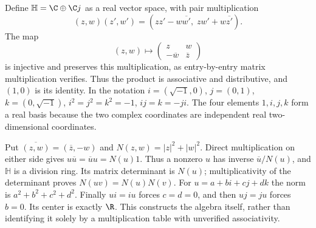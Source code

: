 Define $\mathbb H=\C\oplus\C j$ as a real vector space, with pair
multiplication
\[
 (z,w)(z',w')=(zz'-w\overline{w'},\;zw'+w\overline{z'}).
\]
The map
\[
 (z,w)\longmapsto
 \begin{pmatrix}z&w\\-\overline w&\overline z\end{pmatrix}
\]
is injective and preserves this multiplication, as entry-by-entry matrix
multiplication verifies. Thus the product is associative and distributive,
and $(1,0)$ is its identity. In the notation
$i=(\sqrt{-1},0)$, $j=(0,1)$, $k=(0,\sqrt{-1})$,
$i^2=j^2=k^2=-1$, $ij=k=-ji$. The four elements $1,i,j,k$ form a
real basis because the two complex coordinates are independent real
two-dimensional coordinates.

Put $\overline{(z,w)}=(\overline z,-w)$ and
$N(z,w)=|z|^2+|w|^2$. Direct multiplication on either side gives
$u\overline u=\overline u u=N(u)1$. Thus a nonzero $u$ has inverse
$\overline u/N(u)$, and $\mathbb H$ is a division ring. Its matrix
determinant is $N(u)$; multiplicativity of the determinant proves
$N(uv)=N(u)N(v)$. For $u=a+bi+cj+dk$ the norm is
$a^2+b^2+c^2+d^2$. Finally $ui=iu$ forces $c=d=0$, and then
$uj=ju$ forces $b=0$. Its center is exactly $\R$. This constructs
the algebra itself, rather than identifying it solely by a multiplication
table with unverified associativity.

